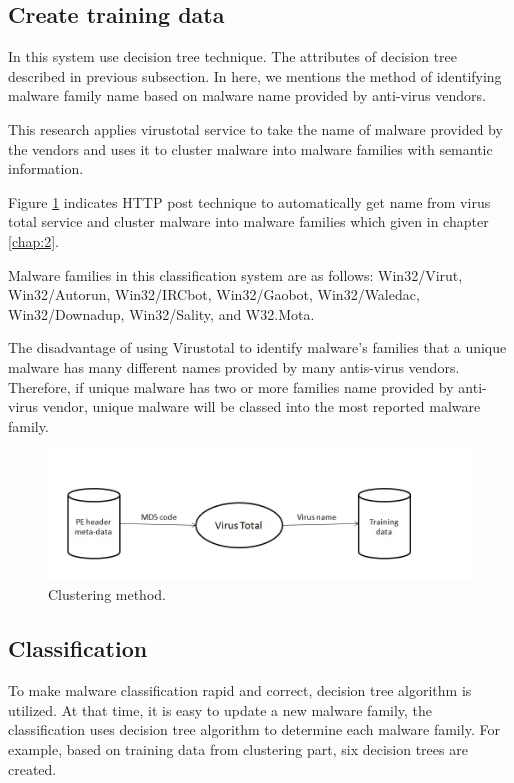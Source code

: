 \subsection{Create training data}

In this system use decision tree technique. The attributes of decision tree described in previous subsection. In here, we mentions the method of identifying malware family name based on malware name provided by anti-virus vendors.

This research applies virustotal service to take the name of malware provided by the vendors and uses it to cluster malware into malware families with semantic information.

Figure \ref{fig:clustering} indicates HTTP post technique to automatically get name from virus total service and cluster malware into malware families which given in chapter \ref{chap:2}.

Malware families in this classification system are as follows: Win32/Virut, Win32/Autorun, Win32/IRCbot, Win32/Gaobot, Win32/Waledac, Win32/Downadup, Win32/Sality, and W32.Mota. 

The disadvantage of using Virustotal to identify malware's families that a unique malware has many different names provided by many antis-virus vendors. Therefore, if unique malware has two or more families name provided by anti-virus vendor, unique malware will be classed into the most reported malware family.
\begin{figure}[h!]
\centering
\includegraphics[width=1\textwidth]{graph/clustering.jpg}
\caption{Clustering method.}
\label{fig:clustering}
\end{figure}

\subsection{Classification}

To make malware classification rapid and correct, decision tree algorithm is utilized. At that time, it is easy to update a new malware family, the classification uses decision tree algorithm to determine each malware family. For example, based on training data from clustering part, six decision trees are created.

